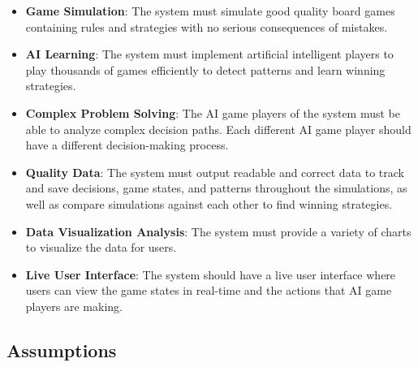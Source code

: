 \documentclass[12pt]{article}
\begin{document}
\begin{itemize}

\item \textbf{Game Simulation}: The system must simulate good quality board games containing rules and strategies with no serious consequences of mistakes.

\item \textbf{AI Learning}:
The system must implement artificial intelligent players to play thousands of games efficiently to detect patterns and learn winning strategies.   

\item \textbf{Complex Problem Solving}:
The AI game players of the system must be able to analyze complex decision paths. Each different AI game player should have a different decision-making process.  

\item \textbf{Quality Data}:
The system must output readable and correct data to track and save decisions, game states, and patterns throughout the simulations, as well as compare simulations against each other to find winning strategies.

\item \textbf{Data Visualization Analysis}:
The system must provide a variety of charts to visualize the data for users.

\item \textbf{Live User Interface}:
The system should have a live user interface where users can view the game states in real-time and the actions that AI game players are making.


\end{itemize}

\subsection{Assumptions} \label{sec_assumpt}
\end{document}

